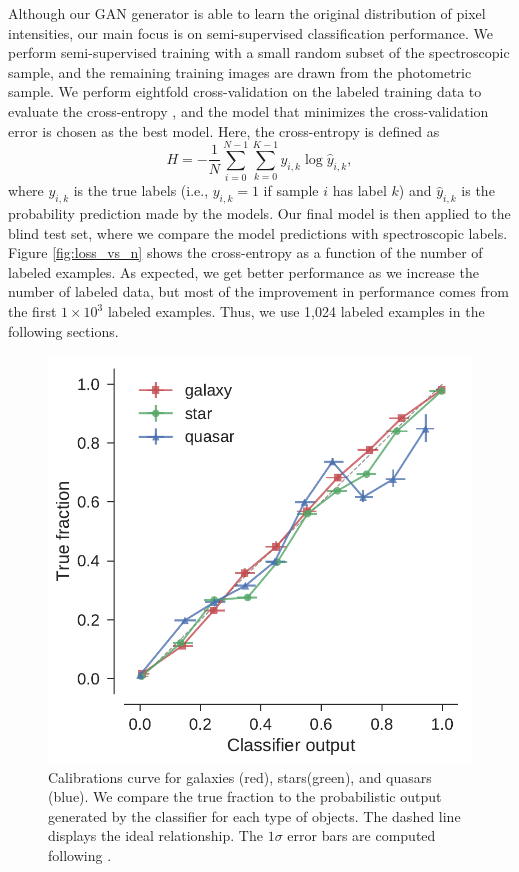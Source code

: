 \documentclass[fleqn,usenatbib]{mnras}
\newcommand{\ie}{{i.e., }}
\begin{document}
Although our GAN generator is able to learn the original distribution of pixel intensities,
our main focus is on semi-supervised classification performance.
We perform semi-supervised training with a small random subset of the spectroscopic sample,
and the remaining training images are drawn from the photometric sample.
We perform eightfold cross-validation on the labeled training data to evaluate the cross-entropy
\citep[also called log loss;][]{murphy2012machine},
and the model that minimizes the cross-validation error is chosen as the best model.
Here, the cross-entropy is defined as
\begin{equation}
H = - \frac{1}{N} \sum_{i=0}^{N-1} \sum_{k=0}^{K-1} y_{i,k} \log \hat{y}_{i,k},
\end{equation}
where $y_{i,k}$ is the true labels (\ie $y_{i,k} = 1$ if sample $i$ has label $k$) and
$\hat{y}_{i,k}$ is the probability prediction made by the models.
Our final model is then applied to the blind test set, where we compare the model predictions with spectroscopic labels.
Figure \ref{fig:loss_vs_n} shows the cross-entropy as a function of the number of labeled examples.
As expected, we get better performance as we increase the number of labeled data,
but most of the improvement in performance comes from the first $1 \times 10^3$ labeled examples.
Thus, we use 1,024 labeled examples in the following sections.


\begin{figure}
  \centering
  \includegraphics[width=\columnwidth]{figures/calibration_curve.pdf}
  \caption{
    Calibrations curve for galaxies (red), stars(green), and quasars (blue).
    We compare the true fraction to the probabilistic output generated by the classifier for each type
    of objects.
    The dashed line displays the ideal relationship.
    The $1 \sigma$ error bars are computed following \citet{paterno2004calculating}.}
  \label{fig:calibration_curve}
\end{figure}
\end{document}
